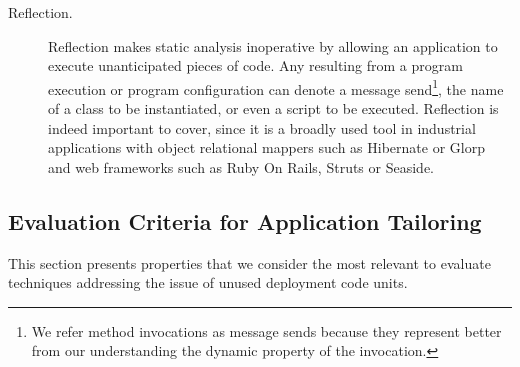 \begin{description}
\item[Reflection.] Reflection makes static analysis inoperative by allowing an application to execute unanticipated pieces of code. 
Any  resulting from a program execution or program configuration can denote a message send\footnote{We refer method invocations as message sends because they represent better from our understanding the dynamic property of the invocation.}, the name of a class to be instantiated, or even a script to be executed. Reflection is indeed important to cover, since it is a broadly used tool in industrial applications with object relational mappers such as Hibernate or Glorp and web frameworks such as Ruby On Rails, Struts or Seaside.
\end{description}

\subsection{Evaluation Criteria for Application Tailoring} \label{sec:criteria}


This section presents properties that we consider the most relevant to evaluate techniques addressing the issue of unused deployment code units.


